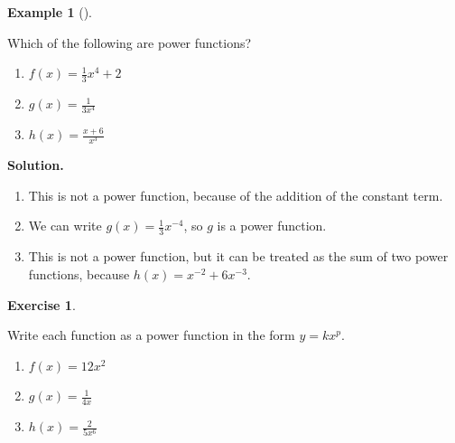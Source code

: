 \documentclass[10pt,]{book}
\theoremstyle{plain}
\theoremstyle{definition}
\theoremstyle{definition}
\theoremstyle{definition}
\newtheorem{example}[theorem]{Example}
\theoremstyle{definition}
\theoremstyle{definition}
\newtheorem{exercise}[theorem]{Exercise}
\numberwithin{equation}{section}
\begin{document}
%
\begin{example}[]\label{example-identify-power-functions}

    Which of the following are power functions?
%
\leavevmode%
\begin{enumerate}[label=*\alph**]
\item\hypertarget{li-428}{}\(f (x) = \frac{1}{3}x^4 + 2\)\item\hypertarget{li-429}{}\(g(x) = \frac{1}{3x^4}\)\item\hypertarget{li-430}{}\(h(x) = \frac{x + 6}{x^3}\)\end{enumerate}
\par\medskip\noindent%
\textbf{Solution.}\quad \leavevmode%
\begin{enumerate}[label=*\alph**]
\item\hypertarget{li-431}{}This is not a power function, because of the addition of the constant term.\item\hypertarget{li-432}{}We can write \(g(x) = \frac{1}{3}x^{−4}\), so \(g\) is a power function.\item\hypertarget{li-433}{}This is not a power function, but it can be treated as the sum of two power functions, because \(h(x) = x^{−2} + 6x^{−3}\).\end{enumerate}
\end{example}
\begin{exercise}\label{exercise-write-as-power-functions}

Write each function as a power function in the form \(y = kx ^p\).
\leavevmode%
\begin{enumerate}[label=*\alph**]
\item\hypertarget{li-434}{}\(f (x) = {12}{x^2}\)\item\hypertarget{li-435}{}\(g(x) = \frac{1}{4x}\)\item\hypertarget{li-436}{}\(h(x) = \frac{2}{5x^6}\)\end{enumerate}
\end{exercise}
\par
\end{document}
